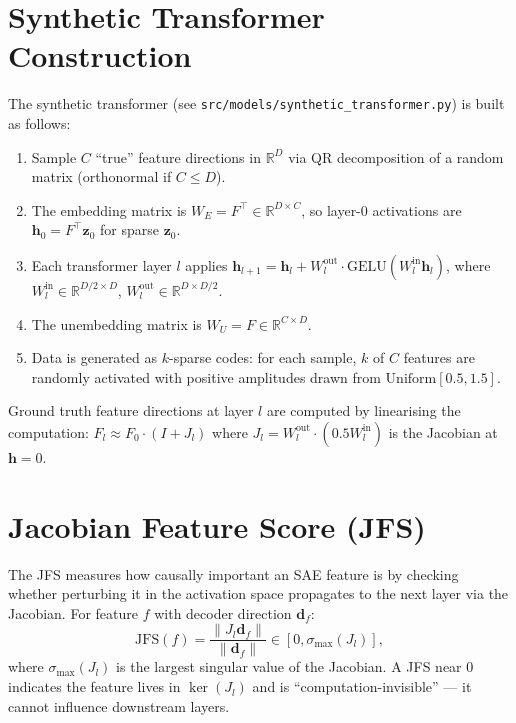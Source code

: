 \documentclass[12pt,a4paper]{article}
\begin{document}
\section{Synthetic Transformer Construction}
\label{app:synthetic}

The synthetic transformer (see \texttt{src/models/synthetic\_transformer.py}) is built as follows:

\begin{enumerate}
  \item Sample $C$ ``true'' feature directions in $\mathbb{R}^D$ via QR decomposition
    of a random matrix (orthonormal if $C \leq D$).
  \item The embedding matrix is $W_E = F^\top \in \mathbb{R}^{D \times C}$, so
    layer-0 activations are $\mathbf{h}_0 = F^\top \mathbf{z}_0$ for sparse $\mathbf{z}_0$.
  \item Each transformer layer $l$ applies $\mathbf{h}_{l+1} = \mathbf{h}_l
    + W_l^{\mathrm{out}} \cdot \mathrm{GELU}(W_l^{\mathrm{in}} \mathbf{h}_l)$,
    where $W_l^{\mathrm{in}} \in \mathbb{R}^{D/2 \times D}$, $W_l^{\mathrm{out}} \in \mathbb{R}^{D \times D/2}$.
  \item The unembedding matrix is $W_U = F \in \mathbb{R}^{C \times D}$.
  \item Data is generated as $k$-sparse codes: for each sample, $k$ of $C$ features
    are randomly activated with positive amplitudes drawn from $\mathrm{Uniform}[0.5, 1.5]$.
\end{enumerate}

Ground truth feature directions at layer $l$ are computed by linearising the
computation: $F_l \approx F_0 \cdot (I + J_l)$ where $J_l = W_l^{\mathrm{out}} \cdot (0.5 W_l^{\mathrm{in}})$
is the Jacobian at $\mathbf{h} = 0$.

\section{Jacobian Feature Score (JFS)}
\label{app:jfs}

The JFS measures how causally important an SAE feature is by checking whether
perturbing it in the activation space propagates to the next layer via the
Jacobian. For feature $f$ with decoder direction $\mathbf{d}_f$:
\[
  \mathrm{JFS}(f) = \frac{\|J_l \mathbf{d}_f\|}{\|\mathbf{d}_f\|} \in [0, \sigma_{\max}(J_l)],
\]
where $\sigma_{\max}(J_l)$ is the largest singular value of the Jacobian.
A JFS near 0 indicates the feature lives in $\ker(J_l)$ and is
``computation-invisible'' — it cannot influence downstream layers.
\end{document}
